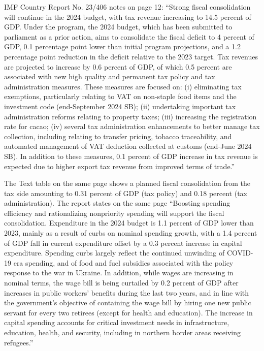 IMF Country Report No. 23/406 notes on page 12: “Strong fiscal consolidation will continue in the 2024 budget, with tax revenue increasing to 14.5 percent of GDP. Under the program, the 2024 budget, which has been submitted to parliament as a prior action, aims to consolidate the fiscal deficit to 4 percent of GDP, 0.1 percentage point lower than initial program projections, and a 1.2 percentage point reduction in the deficit relative to the 2023 target. Tax revenues are projected to increase by 0.6 percent of GDP, of which 0.5 percent are associated with new high quality and permanent tax policy and tax administration measures. These measures are focused on: (i) eliminating tax exemptions, particularly relating to VAT on non-staple food items and the investment code (end-September 2024 SB); (ii) undertaking important tax administration reforms relating to property taxes; (iii) increasing the registration rate for cacao; (iv) several tax administration enhancements to better manage tax collection, including relating to transfer pricing, tobacco traceability, and automated management of VAT deduction collected at customs (end-June 2024 SB). In addition to these measures, 0.1 percent of GDP increase in tax revenue is expected due to higher export tax revenue from improved terms of trade.”

The Text table on the same page shows a planned fiscal consolidation from the tax side amounting to 0.31 percent of GDP (tax policy) and 0.18 percent (tax administration). The report states on the same page “Boosting spending efficiency and rationalizing nonpriority spending will support the fiscal consolidation. Expenditure in the 2024 budget is 1.1 percent of GDP lower than 2023, mainly as a result of curbs on nominal spending growth, with a 1.4 percent of GDP fall in current expenditure offset by a 0.3 percent increase in capital expenditure. Spending curbs largely reflect the continued unwinding of COVID-19 era spending, and of food and fuel subsidies associated with the policy response to the war in Ukraine. In addition, while wages are increasing in nominal terms, the wage bill is being curtailed by 0.2 percent of GDP after increases in public workers’ benefits during the last two years, and in line with the government’s objective of containing the wage bill by hiring one new public servant for every two retirees (except for health and education). The increase in capital spending accounts for critical investment needs in infrastructure, education, health, and security, including in northern border areas receiving refugees.” 

